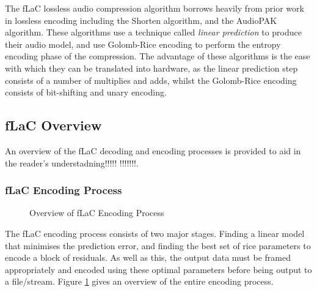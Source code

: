 \documentclass[12pt]{scrartcl}
\begin{document}
  The fLaC lossless audio compression algorithm borrows heavily from prior work in lossless encoding including the Shorten algorithm\cite{shorten}, and the AudioPAK algorithm\cite{audiopak}. These algorithms use a technique called \textit{linear prediction} to produce their audio model, and use Golomb-Rice encoding to perform the entropy encoding phase of the compression. The advantage of these algorithms is the ease with which they can be translated into hardware, as the linear prediction step consists of a number of multiplies and adds, whilst the Golomb-Rice encoding consists of bit-shifting and unary encoding.
  
  \subsection{fLaC Overview}
  An overview of the fLaC decoding and encoding processes is provided to aid in the reader's understadning!!!!! !!!!!!!.
  \subsubsection{fLaC Encoding Process}
  \begin{figure}[H]
    \caption{Overview of fLaC Encoding Process}
    \label{fig:encoding_process}
  \end{figure}
  The fLaC encoding process consists of two major stages. Finding a linear model that minimises the prediction error, and finding the best set of rice parameters to encode a block of residuals. As well as this, the output data must be framed appropriately and encoded using these optimal parameters before being output to a file/stream. Figure \ref{fig:encoding_process} gives an overview of the entire encoding process.
  
\end{document}
